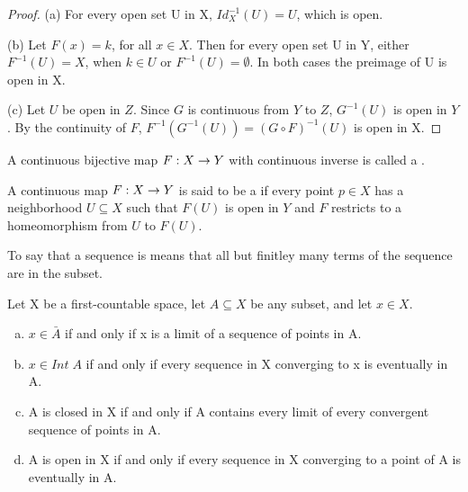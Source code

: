 \documentclass[11pt,a4paper]{article}
\begin{document}
\begin{proof}
    (a) For every open set U in X, $Id_X^{-1}(U) = U$, which is open.

    (b) Let $F(x)=k$, for all $x\in X$. Then for every open set U in Y, either $F^{-1}(U) = {X}$, when $k\in U$ or $F^{-1}(U)=\emptyset$. In both cases the preimage of U is open in X.

    (c) Let $U$ be open in $Z$. Since $G$ is continuous from $Y$ to $Z$, $G^{-1}(U)$ is open in $Y$. By the continuity of $F$, $F^{-1}(G^{-1}(U)) = (G\circ F)^{-1}(U)$ is open in X.
\end{proof}

\begin{mydef}
    A continuous bijective map $F:X\rightarrow Y$ with continuous inverse is called a .
\end{mydef}

\begin{mydef}\label{def:local_homeormorphism}
    A continuous map $F:X\rightarrow Y$ is said to be a  if every point $p\in X$ has a neighborhood $U\subseteq X$ such that $F(U)$ is open in $Y$ and $F$ restricts to a homeomorphism from $U$ to $F(U)$.
\end{mydef}

To say that a sequence is  means that all but finitley many terms of the sequence are in the subset.

\begin{prop}\label{prop:seq_lemma}
    Let X be a first-countable space, let $A\subseteq X$ be any subset, and let $x\in X$.
    \begin{enumerate}[(a)]
        \item $x\in \bar{A}$ if and only if x is a limit of a sequence of points in A.
        \item $x\in Int\;A$ if and only if every sequence in X converging to x is eventually in A.
        \item A is closed in X if and only if A contains every limit of every convergent sequence of points in A.
        \item A is open in X if and only if every sequence in X converging to a point of A is eventually in A. 
    \end{enumerate}
\end{prop}
\end{document}
